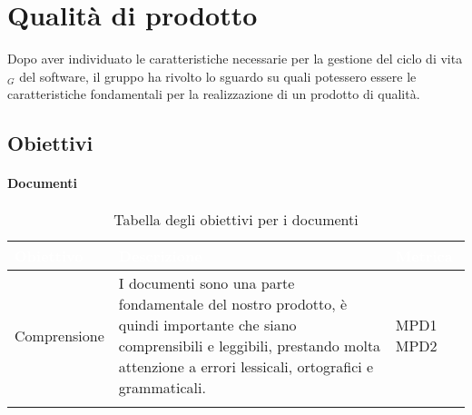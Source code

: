 \chapter{Qualità di prodotto}
Dopo aver individuato le caratteristiche necessarie per la gestione del ciclo di vita $_G$ del software, il gruppo ha rivolto lo sguardo su quali potessero essere le caratteristiche fondamentali per la realizzazione di un prodotto di qualità.
\section{Obiettivi}
\subsubsection{Documenti}

\begin{center}
  \renewcommand{\arraystretch}{1.25}
  \begin{longtable}{|p{3cm}|p{7.5cm}|p{2cm}|} \hline
  \rowcolor[HTML]{036400}
  \textcolor{white}{\textbf{Obiettivo}} & \textcolor{white}{\textbf{Descrizione}} & \textcolor{white}{\textbf{Metrica}} \\[0.2em] \hline
  \rowcolor[HTML]{EFEFEF}
    Comprensione & I documenti sono una parte fondamentale del nostro prodotto, è quindi importante che siano comprensibili e leggibili, prestando molta attenzione a errori lessicali, ortografici e grammaticali.  & MPD1 \newline MPD2       \\ \hline
    \caption{Tabella degli obiettivi per i documenti}
  \end{longtable}
\end{center}


